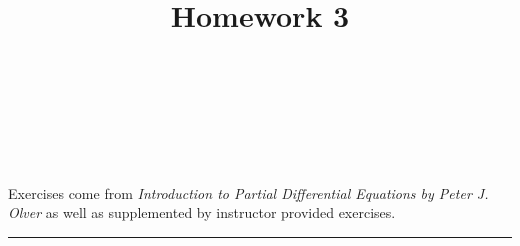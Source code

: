 \documentclass[10pt]{amsart}
\theoremstyle{nonumberplain}
\begin{document}
\pagestyle{empty}

\newcommand{\mline}{\vspace{.2in}\hrule\vspace{.2in}}

\noindent
{} \\
 \\
 \\
 \\

\title{\bf {Homework 3} }


\maketitle
\noindent
Exercises come from \textit{Introduction to Partial Differential Equations by Peter J. Olver} as well as supplemented by instructor provided exercises.
\mline
\end{document}
